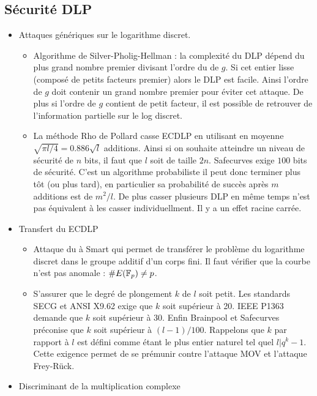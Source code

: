 \documentclass[a4paper]{report}
\begin{document}
\subsection{Sécurité DLP}
\begin{itemize}[label=$\bullet$]
    \item Attaques génériques sur le logarithme discret. 
    \begin{itemize}[label=$\rightarrow$]
        \item Algorithme de Silver-Pholig-Hellman : la complexité du DLP dépend du plus grand nombre premier divisant l'ordre du de $g$. Si cet entier lisse (composé de petits facteurs premier) alors le DLP est facile. Ainsi l'ordre de $g$ doit contenir un grand nombre premier pour éviter cet attaque. De plus si l'ordre de $g$ contient de petit facteur, il est possible de retrouver de l'information partielle sur le log discret. 
        \item La méthode Rho de Pollard casse ECDLP en utilisant en moyenne $\sqrt{\pi l / 4} = 0.886 \sqrt{l}$ additions. Ainsi si on souhaite atteindre un niveau de sécurité de $n$ bits, il faut que $l$ soit de taille $2n$. Safecurves exige $100$ bits de sécurité. C'est un algorithme probabiliste il peut donc terminer plus tôt (ou plus tard), en particulier sa probabilité de succès après $m$ additions est de $m^2 / l$. De plus casser plusieurs DLP en même temps n'est pas équivalent à les casser individuellment. Il y a un effet racine carrée.
    \end{itemize}
    \item Transfert du ECDLP
    \begin{itemize}[label=$\rightarrow$]
        \item Attaque du à Smart qui permet de transférer le problème du logarithme discret dans le groupe additif d'un corps fini. Il faut vérifier que la courbe n'est pas anomale : $\# E(\mathbb{F}_{p}) \neq p$.
        \item S'assurer que le degré de plongement $k$ de $l$ soit petit. Les standards SECG et ANSI X9.62 exige que $k$ soit supérieur à 20. IEEE P1363 demande que $k$ soit supérieur à 30. Enfin Brainpool et Safecurves préconise que $k$ soit supérieur à $(l-1)/100$. Rappelons que $k$ par rapport à $l$ est défini comme étant le plus entier naturel tel quel $l | q^k - 1$. Cette exigence permet de se prémunir contre l'attaque MOV et l'attaque Frey-Rück.
    \end{itemize}
    \item Discriminant de la multiplication complexe
\end{itemize}
\end{document}
